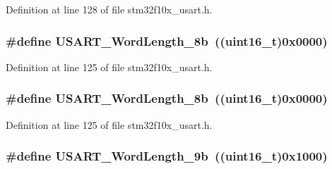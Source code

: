 Definition at line 128 of file stm32f10x\+\_\+usart.\+h.

\subsubsection[{\texorpdfstring{U\+S\+A\+R\+T\+\_\+\+Word\+Length\+\_\+8b}{USART_WordLength_8b}}]{\setlength{\rightskip}{0pt plus 5cm}\#define U\+S\+A\+R\+T\+\_\+\+Word\+Length\+\_\+8b~(({\bf uint16\+\_\+t})0x0000)}\hypertarget{group___u_s_a_r_t___word___length_ga08682faddc657df85a93627b5a146c25}{}\label{group___u_s_a_r_t___word___length_ga08682faddc657df85a93627b5a146c25}


Definition at line 125 of file stm32f10x\+\_\+usart.\+h.

\subsubsection[{\texorpdfstring{U\+S\+A\+R\+T\+\_\+\+Word\+Length\+\_\+8b}{USART_WordLength_8b}}]{\setlength{\rightskip}{0pt plus 5cm}\#define U\+S\+A\+R\+T\+\_\+\+Word\+Length\+\_\+8b~(({\bf uint16\+\_\+t})0x0000)}\hypertarget{group___u_s_a_r_t___word___length_ga08682faddc657df85a93627b5a146c25}{}\label{group___u_s_a_r_t___word___length_ga08682faddc657df85a93627b5a146c25}


Definition at line 125 of file stm32f10x\+\_\+usart.\+h.

\subsubsection[{\texorpdfstring{U\+S\+A\+R\+T\+\_\+\+Word\+Length\+\_\+9b}{USART_WordLength_9b}}]{\setlength{\rightskip}{0pt plus 5cm}\#define U\+S\+A\+R\+T\+\_\+\+Word\+Length\+\_\+9b~(({\bf uint16\+\_\+t})0x1000)}\hypertarget{group___u_s_a_r_t___word___length_gae7dd162142660e09e2321aa3f33dc4d2}{}\label{group___u_s_a_r_t___word___length_gae7dd162142660e09e2321aa3f33dc4d2}



